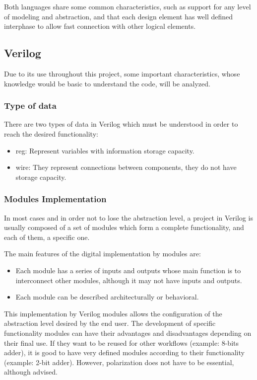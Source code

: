 Both languages share some common characteristics, such as support for any level of modeling and abstraction, and that each design element has well defined interphase to allow fast connection with other logical elements.

\subsection{Verilog}\label{sec:Verilog}
Due to its use throughout this project, some important characteristics, whose knowledge would be basic to understand the code, will be analyzed.

\subsubsection{Type of data}

There are two types of data in Verilog which must be understood in order to reach the desired functionality:
\begin{itemize}
	\item reg: Represent variables with information storage capacity.
	\item wire: They represent connections between components, they do not have storage capacity.
\end{itemize}

\subsubsection{Modules Implementation}
In most cases and in order not to lose the abstraction level, a project in Verilog\cite{496013} is usually composed of a set of modules which form a complete functionality, and each of them, a specific one. \newline

The main features of the digital implementation by modules are:
\begin{itemize}
	\item Each module has a series of inputs and outputs whose main function is to interconnect other modules, although it may not have inputs and outputs.
	\item Each module can be described architecturally or behavioral.
\end{itemize}

This implementation by Verilog modules allows the configuration of the abstraction level desired by the end user. The development of specific functionality modules can have their advantages and disadvantages depending on their final use. If they want to be reused for other workflows (example: 8-bits adder), it is good to have very defined modules according to their functionality (example: 2-bit adder). However, polarization does not have to be essential, although advised.

